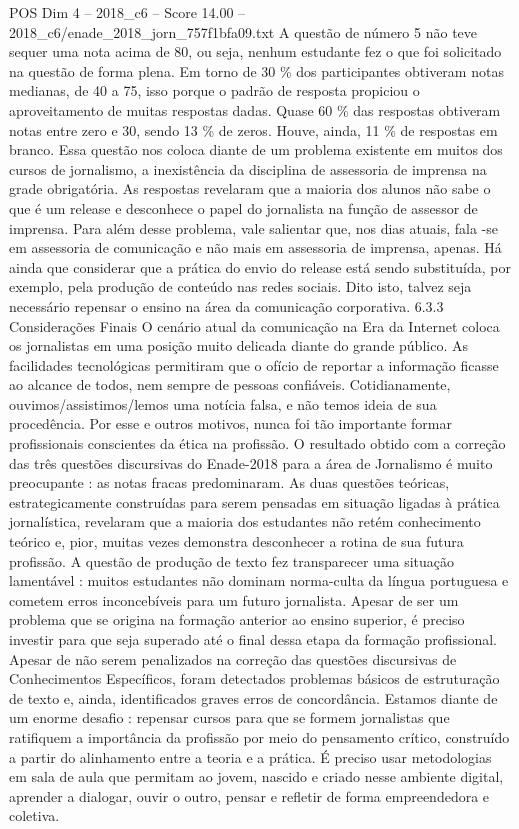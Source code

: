 \begin{textsample}{POS Dim 4 – 2018\_c6 – Score 14.00 – 2018\_c6/enade\_2018\_jorn\_757f1bfa09.txt}
A questão de número 5 não teve sequer uma nota acima de 80, ou seja, nenhum estudante fez o que foi solicitado na questão de forma plena.
Em torno de 30 \% dos participantes obtiveram notas medianas, de 40 a 75, isso porque o padrão de resposta propiciou o aproveitamento de muitas respostas dadas.
Quase 60 \% das respostas obtiveram notas entre zero e 30, sendo 13 \% de zeros.
Houve, ainda, 11 \% de respostas em branco.
Essa questão nos coloca diante de um problema existente em muitos dos cursos de jornalismo, a inexistência da disciplina de assessoria de imprensa na grade obrigatória.
As respostas revelaram que a maioria dos alunos não sabe o que é um release e desconhece o papel do jornalista na função de assessor de imprensa.
Para além desse problema, vale salientar que, nos dias atuais, fala -se em assessoria de comunicação e não mais em assessoria de imprensa, apenas.
Há ainda que considerar que a prática do envio do release está sendo substituída, por exemplo, pela produção de conteúdo nas redes sociais.
Dito isto, talvez seja necessário repensar o ensino na área da comunicação corporativa. 6.3.3 Considerações Finais O cenário atual da comunicação na Era da Internet coloca os jornalistas em uma posição muito delicada diante do grande público.
As facilidades tecnológicas permitiram que o ofício de reportar a informação ficasse ao alcance de todos, nem sempre de pessoas confiáveis.
Cotidianamente, ouvimos/assistimos/lemos uma notícia falsa, e não temos ideia de sua procedência.
Por esse e outros motivos, nunca foi tão importante formar profissionais conscientes da ética na profissão.
O resultado obtido com a correção das três questões discursivas do Enade-2018 para a área de Jornalismo é muito preocupante : as notas fracas predominaram.
As duas questões teóricas, estrategicamente construídas para serem pensadas em situação ligadas à prática jornalística, revelaram que a maioria dos estudantes não retém conhecimento teórico e, pior, muitas vezes demonstra desconhecer a rotina de sua futura profissão.
A questão de produção de texto fez transparecer uma situação lamentável : muitos estudantes não dominam norma-culta da língua portuguesa e cometem erros inconcebíveis para um futuro jornalista.
Apesar de ser um problema que se origina na formação anterior ao ensino superior, é preciso investir para que seja superado até o final dessa etapa da formação profissional.
Apesar de não serem penalizados na correção das questões discursivas de Conhecimentos Específicos, foram detectados problemas básicos de estruturação de texto e, ainda, identificados graves erros de concordância.
Estamos diante de um enorme desafio : repensar cursos para que se formem jornalistas que ratifiquem a importância da profissão por meio do pensamento crítico, construído a partir do alinhamento entre a teoria e a prática.
É preciso usar metodologias em sala de aula que permitam ao jovem, nascido e criado nesse ambiente digital, aprender a dialogar, ouvir o outro, pensar e refletir de forma empreendedora e coletiva.

\end{textsample}
